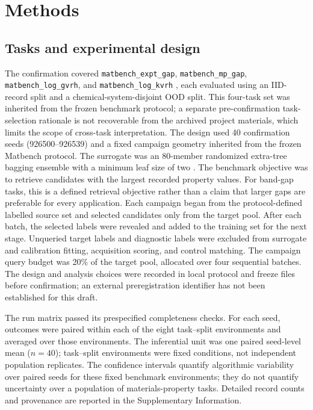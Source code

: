 \documentclass[11pt]{article}
\newcommand{\code}[1]{\texttt{#1}}
\begin{document}
\section{Methods}
\subsection{Tasks and experimental design}
The confirmation covered \code{matbench\_expt\_gap}, \code{matbench\_mp\_gap}, \code{matbench\_log\_gvrh}, and \code{matbench\_log\_kvrh} \citep{dunn2020matbench}, each evaluated using an IID-record split and a chemical-system-disjoint OOD split. This four-task set was inherited from the frozen benchmark protocol; a separate pre-confirmation task-selection rationale is not recoverable from the archived project materials, which limits the scope of cross-task interpretation. The design used 40 confirmation seeds (926500--926539) and a fixed campaign geometry inherited from the frozen Matbench protocol. The surrogate was an 80-member randomized extra-tree bagging ensemble with a minimum leaf size of two \citep{geurts2006extratrees}. The benchmark objective was to retrieve candidates with the largest recorded property values. For band-gap tasks, this is a defined retrieval objective rather than a claim that larger gaps are preferable for every application. Each campaign began from the protocol-defined labelled source set and selected candidates only from the target pool. After each batch, the selected labels were revealed and added to the training set for the next stage. Unqueried target labels and diagnostic labels were excluded from surrogate and calibration fitting, acquisition scoring, and control matching. The campaign query budget was 20\% of the target pool, allocated over four sequential batches. The design and analysis choices were recorded in local protocol and freeze files before confirmation; an external preregistration identifier has not been established for this draft.

The run matrix passed its prespecified completeness checks. For each seed, outcomes were paired within each of the eight task--split environments and averaged over those environments. The inferential unit was one paired seed-level mean (\(n=40\)); task--split environments were fixed conditions, not independent population replicates. The confidence intervals quantify algorithmic variability over paired seeds for these fixed benchmark environments; they do not quantify uncertainty over a population of materials-property tasks. Detailed record counts and provenance are reported in the Supplementary Information.
\end{document}
